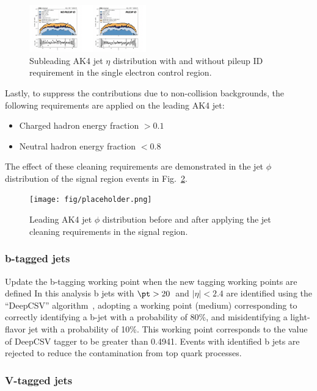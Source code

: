 \begin{figure}[htbp]
  \centering
        \includegraphics[width=0.45\textwidth]{fig/datamc/ak4_eta1_puidcomparison.png}
  \caption{Subleading AK4 jet $\eta$ distribution with and without pileup ID requirement in the single electron control region.}
  \label{fig:pileupid}
\end{figure}

Lastly, to suppress the contributions due to non-collision backgrounds, the following
requirements are applied on the leading AK4 jet:
\begin{itemize}
\item Charged hadron energy fraction $> 0.1$
\item Neutral hadron energy fraction $< 0.8$
\end{itemize}

The effect of these cleaning requirements are demonstrated in the jet $\phi$ distribution of
the signal region events in Fig.~\ref{fig:jetcleaning}.

\begin{figure}[htbp]
  \centering
        \texttt{[image: fig/placeholder.png]}
  \caption{Leading AK4 jet $\phi$ distribution before and after applying the jet cleaning
requirements in the signal region.}
  \label{fig:jetcleaning}
\end{figure}

\subsubsection{b-tagged jets}

{\color{red} Update the b-tagging working point when the new tagging working points are defined}
In this analysis b jets with $\pt > 20$~\GeV and $|\eta| < 2.4$ are identified
using the ``DeepCSV'' algorithm~\cite{Sirunyan:2017ezt},
adopting a working point (medium) corresponding to correctly identifying a b-jet with a
probability of 80\%, and misidentifying a light-flavor jet with a probability of 10\%.
This working point corresponds to the value of DeepCSV tagger to be greater than 0.4941.
Events with identified b jets are rejected to reduce the contamination from top quark processes.

\subsubsection{V-tagged jets}

